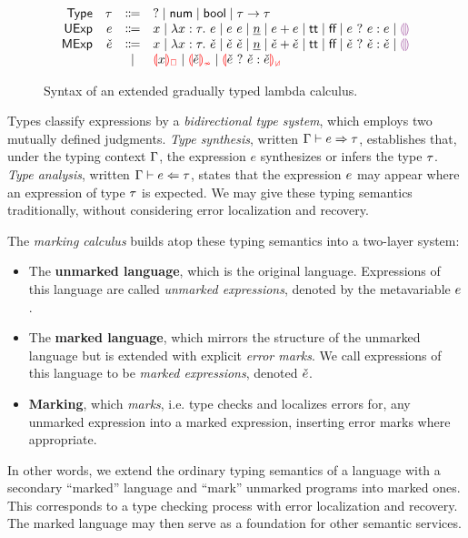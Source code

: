 \begin{figure}[htbp]
  \[\begin{array}{rrcl}
    \TMName  & \TMV  & \Coloneqq & \TUnknown \mid \TNum \mid \TBool \mid \TArrow{\TMV}{\TMV} \\
    \EMName  & \EMV  & \Coloneqq & x \mid \ELam{x}{\TMV}{\EMV} \mid \EAp{\EMV}{\EMV}
                       \mid           \ENumMV \mid \EPlus{\EMV}{\EMV}
                       \mid           \ETrue \mid \EFalse \mid \EIf{\EMV}{\EMV}{\EMV}
                       \mid           \EEHole \\
    \ECMName & \ECMV & \Coloneqq & x \mid \ECLam{x}{\TMV}{\ECMV} \mid \ECAp{\ECMV}{\ECMV}
                       \mid           \ECNumMV \mid \ECPlus{\ECMV}{\ECMV}
                       \mid           \ECTrue \mid \ECFalse \mid \ECIf{\ECMV}{\ECMV}{\ECMV}
                       \mid           \EEHole \\
             &       & \mid         & \ECUnbound{x} \mid \ECInconType{\ECMV} \mid \ECInconBr{\ECMV}{\ECMV}{\ECMV}
  \end{array}\]
  \caption{Syntax of an extended gradually typed lambda calculus.}
  \label{fig:calculus-syntax}
\end{figure}

Types classify expressions by a \emph{bidirectional type system}, which employs two mutually defined
judgments. \emph{Type synthesis}, written $\Gamma \vdash e \Rightarrow \tau$, establishes that, under
the typing context $\Gamma$, the expression $e$ synthesizes or infers the type $\tau$. \emph{Type
analysis}, written $\Gamma \vdash e \Leftarrow \tau$, states that the expression $e$ may appear
where an expression of type $\tau$ is expected. We may give these typing semantics traditionally,
without considering error localization and recovery.

The \emph{marking calculus} builds atop these typing semantics into a two-layer system:
%
\begin{itemize}
  \item The \textbf{unmarked language}, which is the original language. Expressions of this language
    are called \emph{unmarked expressions}, denoted by the metavariable $e$.

  \item The \textbf{marked language}, which mirrors the structure of the unmarked language but is
    extended with explicit \emph{error marks}. We call expressions of this language to be
    \emph{marked expressions}, denoted $\check{e}$.

  \item \textbf{Marking}, which \emph{marks}, i.e. type checks and localizes errors for, any unmarked
    expression into a marked expression, inserting error marks where appropriate.
\end{itemize}
%
In other words, we extend the ordinary typing semantics of a language with a secondary ``marked''
language and ``mark'' unmarked programs into marked ones. This corresponds to a type checking
process with error localization and recovery. The marked language may then serve as a foundation for
other semantic services. %

